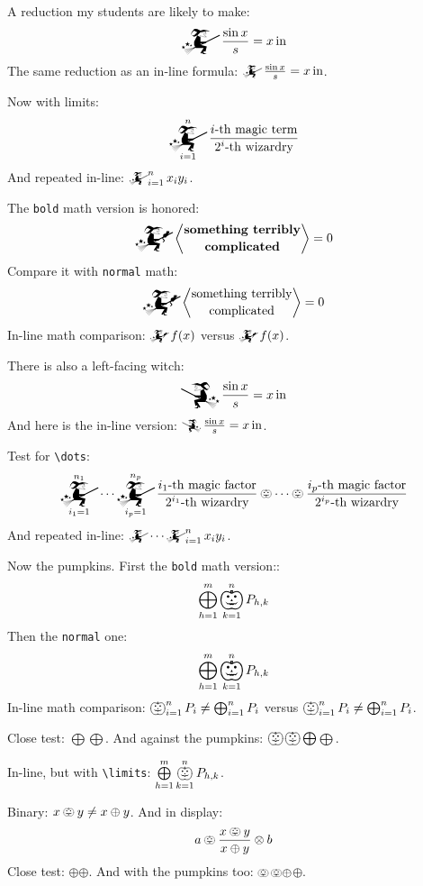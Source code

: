 \documentclass[a4paper]{article}
\begin{document}
\bigbreak

A reduction my students are likely to make:
\[\mathwitch \frac{\sin x}{s} = x\,\mathrm{in}\]
The same reduction as an in-line formula:
\(\mathwitch \frac{\sin x}{s} = x\,\mathrm{in}\).

Now with limits:
\[
	\mathwitch_{i=1}^{n} \frac
		{\text{$i$-th magic term}}
		{\text{$2^{i}$-th wizardry}}
\]
And repeated in-line: \( \mathwitch_{i=1}^{n} x_{i}y_{i} \).

The \texttt{bold} math version is honored:
\[
	\mathwitch*
		\genfrac{<}{>}{0pt}{}
			{\textbf{something terribly}}{\textbf{complicated}}
	= 0
\]
Compare it with \texttt{normal} math:
\[
	\mathwitch*
		\genfrac{<}{>}{0pt}{}
			{\text{something terribly}}{\text{complicated}}
	= 0
\]
In-line math comparison:
{\boldmath $\mathwitch* f(x)$} versus $\mathwitch* f(x)$.

There is also a left-facing witch:
\[\reversemathwitch \frac{\sin x}{s} = x\,\mathrm{in}\]
And here is the in-line version:
\(\reversemathwitch \frac{\sin x}{s} = x\,\mathrm{in}\).

Test for \verb|\dots|:
\[
	\mathwitch_{i_{1}=1}^{n_{1}} \dots \mathwitch_{i_{p}=1}^{n_{p}}
	\frac
		{\text{$i_{1}$-th magic factor}}
		{\text{$2^{i_{1}}$-th wizardry}}
	\pumpkin\dots\pumpkin
	\frac
		{\text{$i_{p}$-th magic factor}}
		{\text{$2^{i_{p}}$-th wizardry}}
\]
And repeated in-line: \( \mathwitch\dots\mathwitch_{i=1}^{n} x_{i}y_{i} \).

\bigbreak

Now the pumpkins.  First the \texttt{bold} math version::
\[ \bigoplus_{h=1}^{m}\bigpumpkin_{k=1}^{n} P_{h,k} \]
Then the \texttt{normal} one:
\[ \bigoplus_{h=1}^{m}\bigpumpkin_{k=1}^{n} P_{h,k} \]
In-line math comparison:
{\boldmath \( \bigpumpkin_{i=1}^{n} P_{i} \neq \bigoplus_{i=1}^{n} P_{i} \)}
versus \( \bigpumpkin_{i=1}^{n} P_{i} \neq \bigoplus_{i=1}^{n} P_{i} \).

Close test: {\boldmath $\bigoplus$}$\bigoplus$.
And against the pumpkins:
{\boldmath $\bigpumpkin$}$\bigpumpkin\bigoplus${\boldmath $\bigoplus$}.

In-line, but with \verb|\limits|:
\( \bigoplus\limits_{h=1}^{m}\bigpumpkin\limits_{k=1}^{n} P_{h,k} \).

Binary: \( x\pumpkin y \neq x\oplus y \).  And in display:
\[ a\pumpkin\frac{x\pumpkin y}{x\oplus y}\otimes b \]
Close test: {\boldmath $\oplus$}$\oplus$.
And with the pumpkins too:
{\boldmath $\pumpkin$}$\pumpkin\oplus${\boldmath $\oplus$}.
\end{document}
